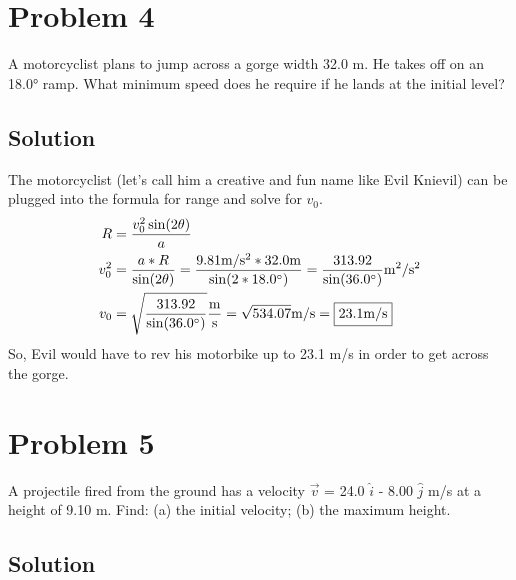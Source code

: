 \documentclass[12pt]{article}
\begin{document}
\pagebreak
\section*{Problem 4}
A motorcyclist plans to jump across a gorge width 32.0 m. He takes off on an 18.0\unit{\degree} ramp.
What minimum speed does he require if he lands at the initial level?

\subsection*{Solution}
The motorcyclist (let's call him a creative and fun name like Evil Knievil) can be plugged into the formula for range and solve for $v_0$.
\begin{align}
    R &= \frac{v_0^2 \sin(2\theta)}{a}\\
    v_0^2 &= \frac{a*R}{\sin(2\theta)} 
        = \frac{9.81\unit{\meter/\second^2} * 32.0\unit{\meter}}{\sin(2*18.0\unit{\degree})}
        = \frac{313.92}{\sin(36.0\unit{\degree})}\unit{\meter^2/\second^2}\\
    v_0 &= \sqrt{\frac{313.92}{\sin(36.0\unit{\degree})}} \unit{\frac{\meter}{\second}} 
        = \sqrt{534.07} \unit{\meter/\second} 
        = \boxed{ 23.1 \unit{\meter/\second} }
\end{align}
So, Evil would have to rev his motorbike up to 23.1 m/s in order to get across the gorge.


\pagebreak
\section*{Problem 5}
A projectile fired from the ground has a velocity $\vec{v}$ = 24.0 $\hat{i}$ - 8.00 $\hat{j}$ m/s at a height of 9.10 m. Find: (a) the initial velocity; (b) the maximum height.

\subsection*{Solution}


\end{document}
